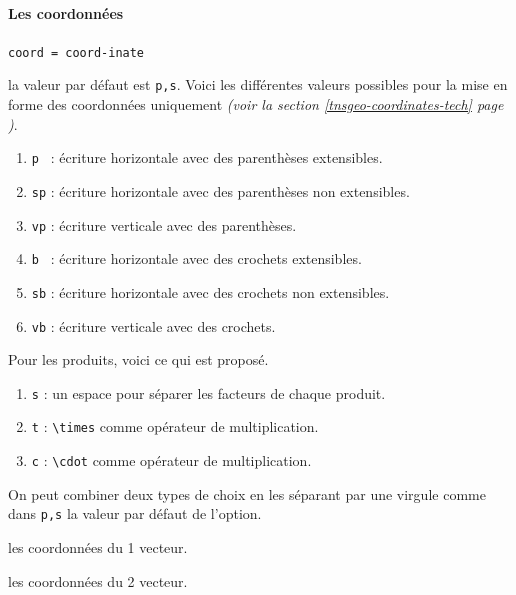 \documentclass[12pt,a4paper]{book}
\newcommand\env[1]{\texttt{#1}}
\newcommand\macro[1]{\env{\textbackslash{}#1}}
\theoremstyle{definition}
\newcommand\mwhyprefix[2]{%
	\texttt{#1 = #1-#2}%
}
\newcommand\prefix[1]{%
	\texttt{#1}%
}
\begin{document}
{{\paragraph{Les coordonnées}



  \hfill \mwhyprefix{coord}{inate}

\IDoption{} la valeur par défaut est \verb+p,s+. 
            Voici les différentes valeurs possibles pour la mise en forme des coordonnées uniquement \emph{(voir la section \ref{tnsgeo-coordinates-tech} page \pageref{tnsgeo-coordinates-tech})}.
\begin{enumerate}
	\item \verb+p + : écriture horizontale avec des parenthèses extensibles.

	\item \verb+sp+ : écriture horizontale avec des parenthèses non extensibles.

	\item \verb+vp+ : écriture verticale avec des parenthèses.

	\medskip
	
	\item \verb+b + : écriture horizontale avec des crochets extensibles.

	\item \verb+sb+ : écriture horizontale avec des crochets non extensibles.

	\item \verb+vb+ : écriture verticale avec des crochets.
\end{enumerate}

            Pour les produits, voici ce qui est proposé.
\begin{enumerate}
	\item \prefix{s} : un espace pour séparer les facteurs de chaque produit.

	\item \prefix{t} : \macro{times} comme opérateur de multiplication.

	\item \prefix{c} : \macro{cdot} comme opérateur de multiplication.
\end{enumerate}

            On peut combiner deux types de choix en les séparant par une virgule comme dans \verb+p,s+ la valeur par défaut de l'option.


 les coordonnées du 1\ier{} vecteur.

 les coordonnées du 2\ieme{} vecteur.


}}
\end{document}
